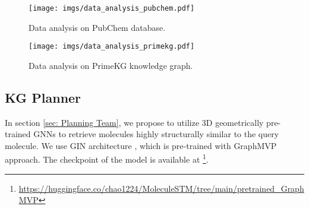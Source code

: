 \begin{figure*}[t]
    \centering
    \begin{minipage}{0.5\linewidth}
        \centering
        \texttt{[image: imgs/data\_analysis\_pubchem.pdf]}
        \caption{Data analysis on PubChem database.}
        \label{app fig: data analysis pubchem}
    \end{minipage}
    \begin{minipage}{0.49\linewidth}
        \centering
        \texttt{[image: imgs/data\_analysis\_primekg.pdf]}
        \caption{Data analysis on PrimeKG knowledge graph.}
        \label{app fig: data analysis primekg}
    \end{minipage}
\end{figure*}

\subsection{KG Planner}
In section \ref{sec: Planning Team}, we propose to utilize 3D geometrically pre-trained GNNs to retrieve molecules highly structurally similar to the query molecule.
We use GIN architecture \cite{xu2018powerful}, which is pre-trained with GraphMVP \cite{liu2021pre} approach.
The checkpoint of the model is available at \footnote{\url{https://huggingface.co/chao1224/MoleculeSTM/tree/main/pretrained_GraphMVP}}.




